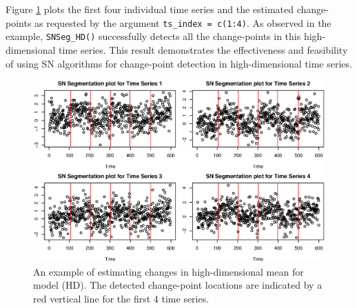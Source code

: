 
{Figure \ref{fig:SN-HD-high-dimensional} plots the first four individual time series and the estimated change-points as requested by the argument \texttt{ts\_index = c(1:4)}.} As observed in the example, \texttt{SNSeg\_HD()} successfully detects all the change-points in this high-dimensional time series. This result demonstrates the effectiveness and feasibility of using SN algorithms for change-point detection in high-dimensional time series.

\begin{figure}[!h]
	\centering
	\includegraphics[scale=0.5]{high-dimensional.eps}
	\caption{An example of estimating changes in high-dimensional mean for model (HD). The detected change-point locations are indicated by a red vertical line for the first 4 time series.}
	\label{fig:SN-HD-high-dimensional}
\end{figure} 

